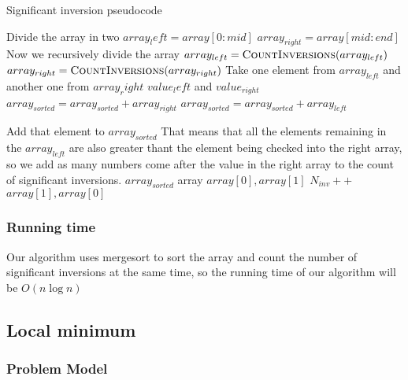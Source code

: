 \documentclass{article}
\begin{document}
\begin{algorithm}[H]
\caption{Significant inversion pseudocode}
\begin{algorithmic}[1]
  \State Divide the array in two
  \State $array_left = array[0:mid]$
  \State $array_{right} = array[mid:end]$
  \State Now we recursively divide the array
  \State $array_{left} = \Call{CountInversions}{array_{left}}$
  \State $array_{right} = \Call{CountInversions}{array_{right}}$
    \State Take one element from $array_{left}$ and another one from $array_right$
    \State $value_left$ and $value_{right}$
    \State $array_{sorted} = array_{sorted} + array_{right}$
   \EndIf
    \State $array_{sorted} = array_{sorted} + array_{left}$
   \EndIf
   
    \State Add that element to $array_{sorted}$
   \Else
     \State That means that all the elements remaining in the $array_{left}$ are also greater
     \State thant the element being checked into the right array, so we add as many numbers come
     \State after the value in the right array to the count of significant inversions.
    \EndIf
   \EndIf
  \EndWhile
  \State \Return $array_{sorted}$
 \EndIf
  \State \Return array
 \ElsIf
   \State \Return $array[0],array[1]$
  \Else
    \State $N_{inv}++$
   \EndIf
   \State \Return $array[1],array[0]$
  \EndIf
 \EndIf
\EndFunction
\end{algorithmic}
\end{algorithm}

\subsubsection*{Running time}

Our algorithm uses mergesort to sort the array and count the number of significant inversions at the same time, so the running time of our algorithm will be $O(n\log n)$

\subsection*{Local minimum}

\subsubsection*{Problem Model}
\end{document}
